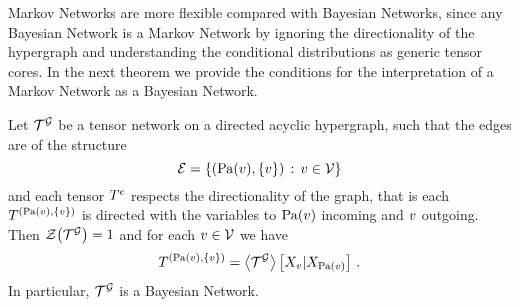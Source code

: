 
Markov Networks are more flexible compared with Bayesian Networks, since any Bayesian Network is a Markov Network by ignoring the directionality of the hypergraph and understanding the conditional distributions as generic tensor cores.
In the next theorem we provide the conditions for the interpretation of a Markov Network as a Bayesian Network.

\begin{theorem}\label{the:MarkovToBayesian}
	Let $\mathcal{T}^{\mathcal{G}}$ be a tensor network on a directed acyclic hypergraph, such that the edges are of the structure
		\[ \mathcal{E} = \{(\mathrm{Pa}(v),\{v\}) \, : \, v\in\mathcal{V}\} \]
	and each tensor $T^{e}$ respects the directionality of the graph, that is each $T^{(\mathrm{Pa}(v), \{v\})}$ is directed with the variables to $\mathrm{Pa}(v)$ incoming and $v$ outgoing.
	Then $\mathcal{Z}{\left(\mathcal{T}^{\mathcal{G}}\right)}=1$ and for each $v\in\mathcal{V}$ we have
		\[ T^{(\mathrm{Pa}(v),\{v\})} = \left\langle \mathcal{T}^{\mathcal{G}}\right\rangle \left[ X_{v} | X_{\mathrm{Pa}(v)} \right] \, . \]
	In particular, $\mathcal{T}^{\mathcal{G}}$ is a Bayesian Network.
\end{theorem}
